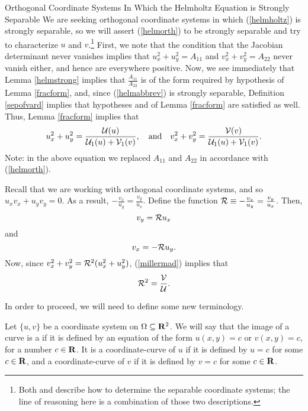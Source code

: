 \begin{section}{Orthogonal Coordinate Systems In Which the Helmholtz Equation is Strongly Separable}
We are seeking orthogonal coordinate systems in which (\ref{helmholtz}) is strongly separable, so we will assert (\ref{helmorth}) to be strongly separable and try to characterize $u$ and $v$.\footnote{Both \cite{miller} and \cite{morse} describe how to determine the separable coordinate systems; the line of reasoning here is a combination of those two descriptions.}  First, we note that the condition that the Jacobian determinant never vanishes implies that $u_x^2 + u_y^2 = A_{11}$ and $v_x^2 + v_y^2 = A_{22}$ never vanish either, and hence are everywhere positive.  Now, we see immediately that Lemma \ref{helmstrong} implies that $\frac{A_{11}}{A_{22}}$ is of the form required by hypothesis  of Lemma \ref{fracform}, and, since (\ref{helmabbrev}) is strongly separable, Definition \ref{sepofvard} implies that hypotheses  and  of Lemma \ref{fracform} are satisfied as well.  Thus, Lemma \ref{fracform} implies that
\begin{equation}
\label{millermad}
u_x^2 + u_y^2 = \frac{\mathcal{U}(u)}{\mathcal{U}_1(u) + \mathcal{V}_1(v)},
\quad \mbox{and} \quad
v_x^2 + v_y^2 = \frac{\mathcal{V}(v)}{\mathcal{U}_1(u) + \mathcal{V}_1(v)}.
\end{equation}
Note: in the above equation we replaced $A_{11}$ and $A_{22}$ in accordance with (\ref{helmorth}).

Recall that we are working with orthogonal coordinate systems, and so $u_x v_x + u_y v_y = 0$.  As a result, $-\frac{v_x}{u_y} = \frac{v_y}{u_x}$.  Define the function $\mathcal{R} \equiv -\frac{v_x}{u_y} = \frac{v_y}{u_x}$.  Then,
\begin{equation}
\label{vye}
v_y = \mathcal{R} u_x
\end{equation}
and
\begin{equation}
\label{vxe}
v_x = - \mathcal{R} u_y.
\end{equation}
Now, since $v_x^2 + v_y^2 = \mathcal{R}^2(u_x^2 + u_y^2)$, (\ref{millermad}) implies that
\begin{equation}
\label{cR2}
\mathcal{R}^2 = \frac{\mathcal{V}}{\mathcal{U}}.
\end{equation}

In order to proceed, we will need to define some new terminology.

\begin{definition}
\label{coordcurve}
Let $\{ u,v \}$ be a coordinate system on $\Omega \subseteq \mathbf{R}^2$.  We will say that the image of a curve is a  if it is defined by an equation of the form $u(x,y) = c$ or $v(x,y) = c$, for a number $c \in \mathbf{R}$.  It is a coordinate-curve of $u$ if it is defined by $u = c$ for some $c \in \mathbf{R}$, and a coordinate-curve of $v$ if it is defined by $v = c$ for some $c \in \mathbf{R}$.
\end{definition}


\end{section}
